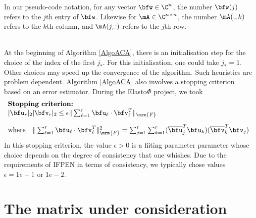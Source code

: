 \noindent 
In our pseudo-code notation, for any vector $\bfw\in \C^{n}$, the number $\bfw(j)$  refers to the $j$th entry of $\bfw$. 
Likewise for $\mA\in \C^{n\times n}$, the number $\mA(:,k)$ refers to the $k$th column, and $\mA(j,:)$ refers to the $j$th
row.

\quad\\
At the beginning of Algorithm \ref{AlgoACA}, there is an initialisation step for the choice of the index of the first $j_{*}$. 
For this initialisation, one could take $j_{*} = 1$. Other choices may speed up the convergence of the algorithm. Such heuristics 
are problem dependent. Algorithm \ref{AlgoACA} also involves a stopping criterion based on an error estimator. During the Elasto$\Phi$ 
project, we took 
$$
\begin{array}{l}
\textbf{Stopping criterion:}\\ 
\vert \bfu_{r}\vert_{2}\vert \bfv_{r}\vert_{2}\leq  \epsilon\Vert \sum_{\ell = 1}^{r}\bfu_{\ell}\cdot\bfv_{\ell}^{T}\Vert_{\mrm{F}}\\[10pt]
\textrm{where}\quad \Vert \sum_{\ell = 1}^{r}\bfu_{\ell}\cdot\bfv_{\ell}^{T}\Vert_{\mrm{F}}^{2} = \sum_{j=1}^{r}\sum_{k=1}^{r}
(\overline{\bfu}_{j}^{T}\bfu_{k})(\overline{\bfv}_{k}^{T}\bfv_{j})
\end{array}
$$
In this stopping criterion, the value $\epsilon>0$ is a fiiting parameter parameter whose choice depends on the degree of consistency 
that one whishes. Due to the requirements of IFPEN in terms of consistency, we typically chose values 
$\epsilon = 1e-1$ or $1e-2$.





\section{The matrix under consideration}\label{sec:GalerkinMatrix}

